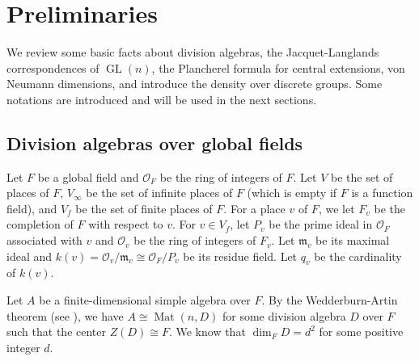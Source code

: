 \documentclass[11pt]{article}
\theoremstyle{plain}
\theoremstyle{remark}
\theoremstyle{definition}
\DeclareMathOperator{\GL}{GL}
\DeclareMathOperator{\Mt}{Mat}
\begin{document}
\section{Preliminaries}\label{spre}

We review some basic facts about division algebras, the Jacquet-Langlands correspondences of $\GL(n)$, the Plancherel formula for central extensions, von Neumann dimensions, and introduce the density over discrete groups. 
Some notations are introduced and will be used in the next sections. 



\subsection{Division algebras over global fields}\label{ssdivnumfield}
 
Let $F$ be a global field and $\mathcal{O}_F$ be the ring of integers of $F$. 
Let $V$ be the set of places of $F$, $V_{\infty}$ be the set of infinite places of $F$ (which is empty if $F$ is a function field), and $V_{f}$ be the set of finite places of $F$. 
For a place $v$ of $F$, we let $F_v$ be the completion of $F$ with respect to $v$.
For $v\in V_f$, let $P_v$ be the prime ideal in $\mathcal{O}_F$ associated with $v$ and $\mathcal{O}_v$ be the ring of integers of $F_v$.  
Let $\mathfrak{m}_v$ be its maximal ideal and $k(v)=\mathcal{O}_v/\mathfrak{m}_v\cong\mathcal{O}_F/P_v$ be its residue field. 
Let $q_v$ be the cardinality of $k(v)$. 

 


Let $A$ be a finite-dimensional simple algebra over $F$. 
By the Wedderburn-Artin theorem (see \cite[Theorem 7.4]{Rei03}), we have $A\cong \Mt(n,D)$ for some division algebra $D$ over $F$ such that the center $Z(D)\cong F$.  
We know that $\dim_F D=d^2$ for some positive integer $d$.
\end{document}
